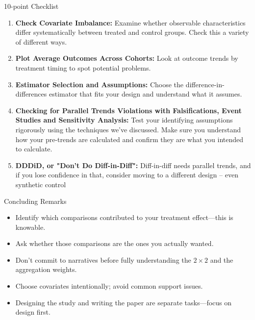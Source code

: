 \documentclass{beamer}
\begin{document}
\begin{frame}{10-point Checklist}

\begin{enumerate}

\item[6. ] \textbf{Check Covariate Imbalance:} Examine whether observable characteristics differ systematically between treated and control groups.  Check this a variety of different ways. 
\item[7. ] \textbf{Plot Average Outcomes Across Cohorts:} Look at outcome trends by treatment timing to spot potential problems.
\item[8. ] \textbf{Estimator Selection and Assumptions:} Choose the difference-in-differences estimator that fits your design and understand what it assumes.
\item[9. ] \textbf{Checking for Parallel Trends Violations with Falsifications, Event Studies and Sensitivity Analysis:} Test your identifying assumptions rigorously using the techniques we've discussed. Make sure you understand how your pre-trends are calculated and confirm they are what you intended to calculate. 
\item[10. ] \textbf{DDDiD, or "Don't Do Diff-in-Diff":} Diff-in-diff needs parallel trends, and if you lose confidence in that, consider moving to a different design -- even synthetic control

\end{enumerate}

\end{frame}




\begin{frame}{Concluding Remarks}

\begin{itemize}
\item Identify which comparisons contributed to your treatment effect—this is knowable.
\item Ask whether those comparisons are the ones you actually wanted.
\item Don’t commit to narratives before fully understanding the $2 \times 2$ and the aggregation weights.
\item Choose covariates intentionally; avoid common support issues.
\item Designing the study and writing the paper are separate tasks—focus on design first.
\end{itemize}

\end{frame}
\end{document}
